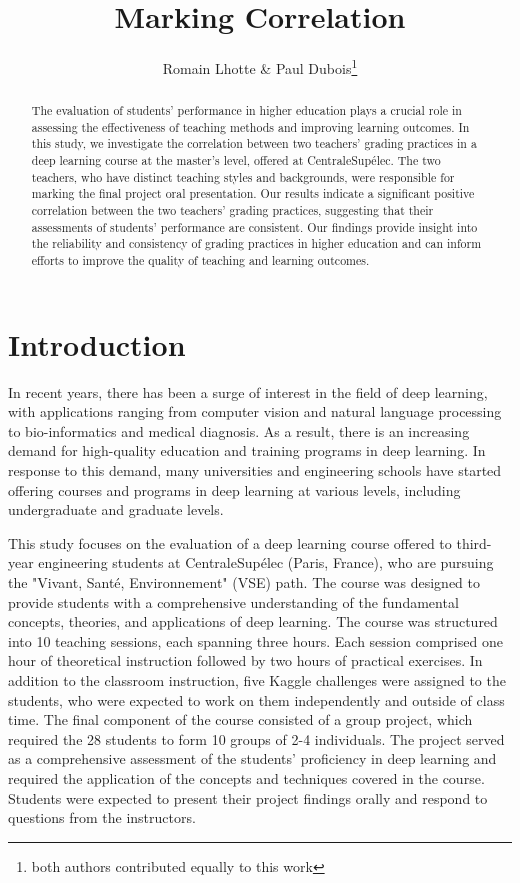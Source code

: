 \documentclass[a4paper]{article}
\title{Marking Correlation}
\author{Romain Lhotte \& Paul Dubois\footnote{both authors contributed equally to this work}}
\begin{document}
\maketitle

\begin{abstract}
	The evaluation of students' performance in higher education plays a crucial role in assessing the effectiveness of teaching methods and improving learning outcomes.
	In this study, we investigate the correlation between two teachers' grading practices in a deep learning course at the master's level, offered at CentraleSupélec.
	The two teachers, who have distinct teaching styles and backgrounds, were responsible for marking the final project oral presentation.
	Our results indicate a significant positive correlation between the two teachers' grading practices, suggesting that their assessments of students' performance are consistent.
	Our findings provide insight into the reliability and consistency of grading practices in higher education and can inform efforts to improve the quality of teaching and learning outcomes.
\end{abstract}

\section{Introduction}
In recent years, there has been a surge of interest in the field of deep learning, with applications ranging from computer vision and natural language processing to bio-informatics and medical diagnosis.
As a result, there is an increasing demand for high-quality education and training programs in deep learning.
In response to this demand, many universities and engineering schools have started offering courses and programs in deep learning at various levels, including undergraduate and graduate levels.

This study focuses on the evaluation of a deep learning course offered to third-year engineering students at CentraleSupélec (Paris, France), who are pursuing the "Vivant, Santé, Environnement" (VSE) path.
The course was designed to provide students with a comprehensive understanding of the fundamental concepts, theories, and applications of deep learning.
The course was structured into 10 teaching sessions, each spanning three hours.
Each session comprised one hour of theoretical instruction followed by two hours of practical exercises.
In addition to the classroom instruction, five Kaggle challenges were assigned to the students, who were expected to work on them independently and outside of class time.
The final component of the course consisted of a group project, which required the 28 students to form 10 groups of 2-4 individuals.
The project served as a comprehensive assessment of the students' proficiency in deep learning and required the application of the concepts and techniques covered in the course.
Students were expected to present their project findings orally and respond to questions from the instructors.
\end{document}
